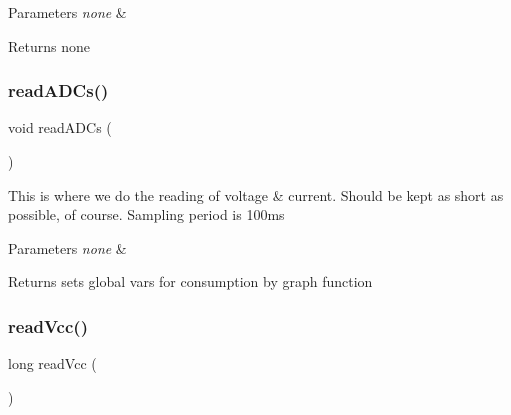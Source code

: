 \begin{DoxyParams}{Parameters}
{\em none} & \\
\hline
\end{DoxyParams}
\begin{DoxyReturn}{Returns}
none 
\end{DoxyReturn}
\hypertarget{_u_s_b___tester___o_l_e_d__128x64___beta__2_82_8ino_a47aaf718ce1182a7225ad5f0123a99a2}{}\label{_u_s_b___tester___o_l_e_d__128x64___beta__2_82_8ino_a47aaf718ce1182a7225ad5f0123a99a2} 
\subsubsection{\texorpdfstring{read\+A\+D\+Cs()}{readADCs()}}
{\footnotesize\ttfamily void read\+A\+D\+Cs (\begin{DoxyParamCaption}{ }\end{DoxyParamCaption})}

This is where we do the reading of voltage \& current. Should be kept as short as possible, of course. Sampling period is 100ms


\begin{DoxyParams}{Parameters}
{\em none} & \\
\hline
\end{DoxyParams}
\begin{DoxyReturn}{Returns}
sets global vars for consumption by graph function 
\end{DoxyReturn}
\hypertarget{_u_s_b___tester___o_l_e_d__128x64___beta__2_82_8ino_a8e23c9421f6663303ea22e4969e2f6c1}{}\label{_u_s_b___tester___o_l_e_d__128x64___beta__2_82_8ino_a8e23c9421f6663303ea22e4969e2f6c1} 
\subsubsection{\texorpdfstring{read\+Vcc()}{readVcc()}}
{\footnotesize\ttfamily long read\+Vcc (\begin{DoxyParamCaption}{ }\end{DoxyParamCaption})}

